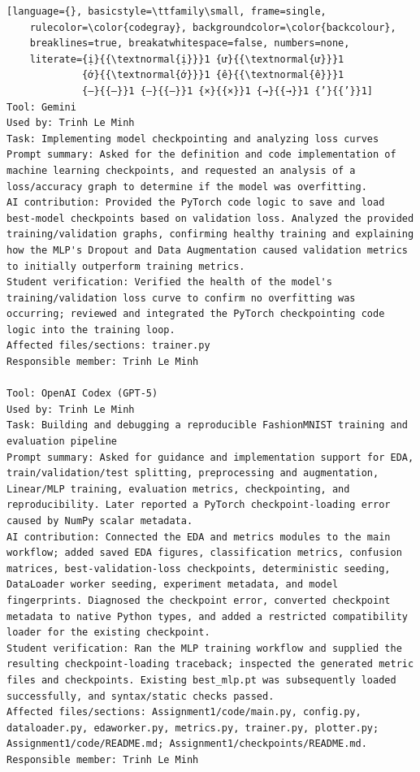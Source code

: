 \begin{lstlisting}[language={}, basicstyle=\ttfamily\small, frame=single,
    rulecolor=\color{codegray}, backgroundcolor=\color{backcolour},
    breaklines=true, breakatwhitespace=false, numbers=none,
    literate={ị}{{\textnormal{ị}}}1 {ư}{{\textnormal{ư}}}1
             {ớ}{{\textnormal{ớ}}}1 {ê}{{\textnormal{ê}}}1
             {—}{{—}}1 {–}{{–}}1 {×}{{×}}1 {→}{{→}}1 {’}{{’}}1]
Tool: Gemini
Used by: Trinh Le Minh
Task: Implementing model checkpointing and analyzing loss curves
Prompt summary: Asked for the definition and code implementation of machine learning checkpoints, and requested an analysis of a loss/accuracy graph to determine if the model was overfitting.
AI contribution: Provided the PyTorch code logic to save and load best-model checkpoints based on validation loss. Analyzed the provided training/validation graphs, confirming healthy training and explaining how the MLP's Dropout and Data Augmentation caused validation metrics to initially outperform training metrics.
Student verification: Verified the health of the model's training/validation loss curve to confirm no overfitting was occurring; reviewed and integrated the PyTorch checkpointing code logic into the training loop.
Affected files/sections: trainer.py
Responsible member: Trinh Le Minh

Tool: OpenAI Codex (GPT-5)
Used by: Trinh Le Minh
Task: Building and debugging a reproducible FashionMNIST training and evaluation pipeline
Prompt summary: Asked for guidance and implementation support for EDA, train/validation/test splitting, preprocessing and augmentation, Linear/MLP training, evaluation metrics, checkpointing, and reproducibility. Later reported a PyTorch checkpoint-loading error caused by NumPy scalar metadata.
AI contribution: Connected the EDA and metrics modules to the main workflow; added saved EDA figures, classification metrics, confusion matrices, best-validation-loss checkpoints, deterministic seeding, DataLoader worker seeding, experiment metadata, and model fingerprints. Diagnosed the checkpoint error, converted checkpoint metadata to native Python types, and added a restricted compatibility loader for the existing checkpoint.
Student verification: Ran the MLP training workflow and supplied the resulting checkpoint-loading traceback; inspected the generated metric files and checkpoints. Existing best_mlp.pt was subsequently loaded successfully, and syntax/static checks passed.
Affected files/sections: Assignment1/code/main.py, config.py, dataloader.py, edaworker.py, metrics.py, trainer.py, plotter.py; Assignment1/code/README.md; Assignment1/checkpoints/README.md.
Responsible member: Trinh Le Minh


\end{lstlisting}
